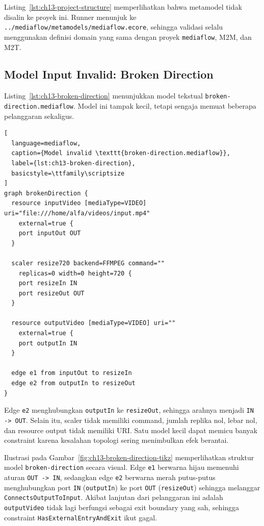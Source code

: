 \noindent Listing~\ref{lst:ch13-project-structure} memperlihatkan bahwa metamodel tidak disalin ke proyek ini. Runner menunjuk ke \texttt{../mediaflow/metamodels/mediaflow.ecore}, sehingga validasi selalu menggunakan definisi domain yang sama dengan proyek \texttt{mediaflow}, M2M, dan M2T.

\subsection{Model Input Invalid: Broken Direction}

Listing~\ref{lst:ch13-broken-direction} menunjukkan model tekstual \texttt{broken-direction.mediaflow}. Model ini tampak kecil, tetapi sengaja memuat beberapa pelanggaran sekaligus.

\begin{lstlisting}[
  language=mediaflow,
  caption={Model invalid \texttt{broken-direction.mediaflow}},
  label={lst:ch13-broken-direction},
  basicstyle=\ttfamily\scriptsize
]
graph brokenDirection {
  resource inputVideo [mediaType=VIDEO] uri="file:///home/alfa/videos/input.mp4"
    external=true {
    port inputOut OUT
  }

  scaler resize720 backend=FFMPEG command=""
    replicas=0 width=0 height=720 {
    port resizeIn IN
    port resizeOut OUT
  }

  resource outputVideo [mediaType=VIDEO] uri=""
    external=true {
    port outputIn IN
  }

  edge e1 from inputOut to resizeIn
  edge e2 from outputIn to resizeOut
}
\end{lstlisting}

\noindent Edge \texttt{e2} menghubungkan \texttt{outputIn} ke \texttt{resizeOut}, sehingga arahnya menjadi \texttt{IN -> OUT}. Selain itu, scaler tidak memiliki command, jumlah replika nol, lebar nol, dan resource output tidak memiliki URI. Satu model kecil dapat memicu banyak constraint karena kesalahan topologi sering menimbulkan efek berantai.

Ilustrasi pada Gambar~\ref{fig:ch13-broken-direction-tikz} memperlihatkan struktur model \texttt{broken-direction} secara visual. Edge \texttt{e1} berwarna hijau memenuhi aturan \texttt{OUT -> IN}, sedangkan edge \texttt{e2} berwarna merah putus-putus menghubungkan port \texttt{IN} (\texttt{outputIn}) ke port \texttt{OUT} (\texttt{resizeOut}) sehingga melanggar \texttt{ConnectsOutputToInput}. Akibat lanjutan dari pelanggaran ini adalah \texttt{outputVideo} tidak lagi berfungsi sebagai exit boundary yang sah, sehingga constraint \texttt{HasExternalEntryAndExit} ikut gagal.

